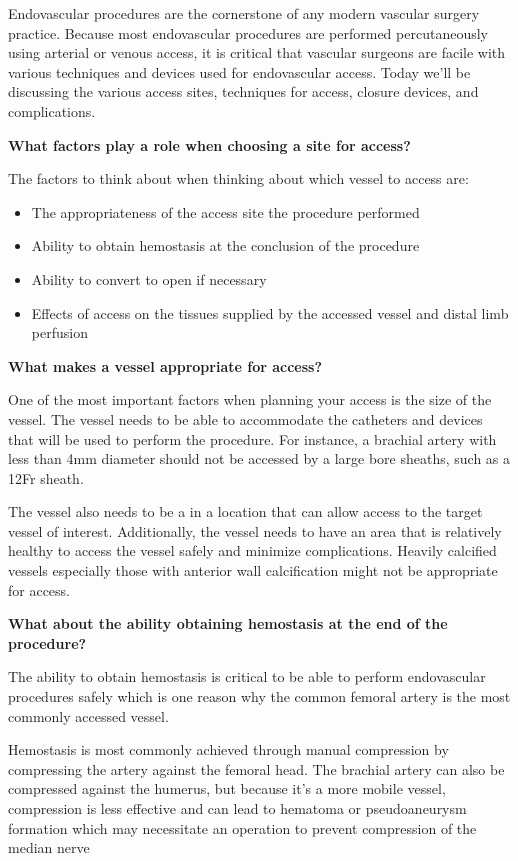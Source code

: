 \documentclass[
]{book}
\begin{document}
Endovascular procedures are the cornerstone of any modern vascular
surgery practice. Because most endovascular procedures are performed
percutaneously using arterial or venous access, it is critical that
vascular surgeons are facile with various techniques and devices used
for endovascular access. Today we'll be discussing the various access
sites, techniques for access, closure devices, and complications.

\textbf{What factors play a role when choosing a site for access?}

The factors to think about when thinking about which vessel to access
are:

\begin{itemize}
\item
  The appropriateness of the access site the procedure performed
\item
  Ability to obtain hemostasis at the conclusion of the procedure
\item
  Ability to convert to open if necessary
\item
  Effects of access on the tissues supplied by the accessed vessel and
  distal limb perfusion
\end{itemize}

\textbf{What makes a vessel appropriate for access?}

One of the most important factors when planning your access is the size
of the vessel. The vessel needs to be able to accommodate the catheters
and devices that will be used to perform the procedure. For instance, a
brachial artery with less than 4mm diameter should not be accessed by a
large bore sheaths, such as a 12Fr sheath.

The vessel also needs to be a in a location that can allow access to the
target vessel of interest. Additionally, the vessel needs to have an
area that is relatively healthy to access the vessel safely and minimize
complications. Heavily calcified vessels especially those with anterior
wall calcification might not be appropriate for access.

\textbf{What about the ability obtaining hemostasis at the end of the
procedure?}

The ability to obtain hemostasis is critical to be able to perform
endovascular procedures safely which is one reason why the common
femoral artery is the most commonly accessed vessel.

Hemostasis is most commonly achieved through manual compression by
compressing the artery against the femoral head. The brachial artery can
also be compressed against the humerus, but because it's a more mobile
vessel, compression is less effective and can lead to hematoma or
pseudoaneurysm formation which may necessitate an operation to prevent
compression of the median nerve
\end{document}
